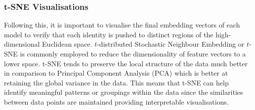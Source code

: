 \documentclass{mpaper}
\begin{document}
\begin{table}[htbp]
    \centering
    \vspace{0.1cm}
    \caption{Table listing the macro-averaged AUC metrics for all fusion methods as well as the individual modalities.}
    \label{tab:macro_auc}
\end{table}


\subsubsection{t-SNE Visualisations}
Following this, it is important to visualise the final embedding vectors of each model to verify that each identity is pushed to distinct regions of the high-dimensional Euclidean space. $t$-distributed Stochastic Neighbour Embedding or $t$-SNE \cite{van2008visualizing} is commonly employed to reduce the dimensionality of  feature vectors to a lower space. t-SNE tends to preserve the local structure of the data much better in comparison to Principal Component Analysis (PCA) which is better at retaining the global variance in the data. This means that t-SNE can help identify meaningful patterns or groupings within the data since the similarities between data points are maintained providing interpretable visualisations.
\end{document}

